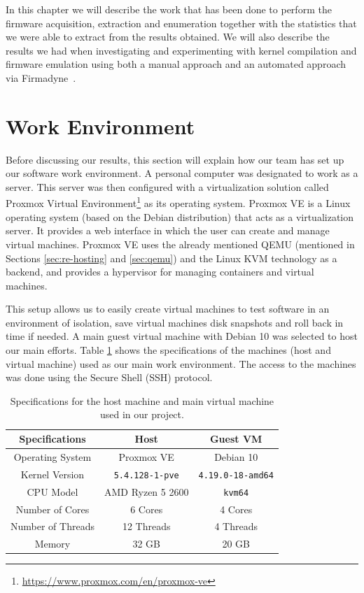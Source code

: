 In this chapter we will describe the work that has been done to perform the firmware acquisition, extraction and enumeration together with the statistics that we were able to extract from the results obtained. We will also describe the results we had when investigating and experimenting with kernel compilation and firmware emulation using both a manual approach and an automated approach via Firmadyne~\cite{firmadyne}.

\section{Work Environment}

Before discussing our results, this section will explain how our team has set up our software work environment. A personal computer was designated to work as a server. This server was then configured with a virtualization solution called Proxmox Virtual Environment\footnote{\url{https://www.proxmox.com/en/proxmox-ve}} as its operating system. Proxmox VE is a Linux operating system (based on the Debian distribution) that acts as a virtualization server. It provides a web interface in which the user can create and manage virtual machines. Proxmox VE uses the already mentioned QEMU \cite{qemu} (mentioned in Sections \ref{sec:re-hosting} and \ref{sec:qemu}) and the Linux KVM technology as a backend, and provides a hypervisor for managing containers and virtual machines.

This setup allows us to easily create virtual machines to test software in an environment of isolation, save virtual machines disk snapshots and roll back in time if needed. A main guest virtual machine with Debian 10 was selected to host our main efforts. Table \ref{tab:vm-specs} shows the specifications of the machines (host and virtual machine) used as our main work environment. The access to the machines was done using the Secure Shell (SSH) protocol.

\begin{table}[H]
\centering
\caption{Specifications for the host machine and main virtual machine used in our project.}
\begin{tabular}{|c|c|c|}
\hline
\textbf{Specifications} & \textbf{Host} & \textbf{Guest VM} \\ \hline
Operating System        & Proxmox VE           & Debian 10             \\
Kernel Version          & {\tt5.4.128-1-pve}   & {\tt 4.19.0-18-amd64} \\
CPU Model               & AMD Ryzen 5 2600     & {\tt kvm64}           \\
Number of Cores         & 6 Cores              & 4 Cores               \\
Number of Threads       & 12 Threads           & 4 Threads             \\
Memory                  & 32 GB                & 20 GB                 \\ \hline
\end{tabular}
\label{tab:vm-specs}
\end{table}

